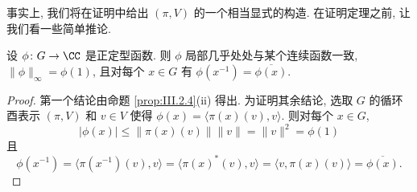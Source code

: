 事实上, 我们将在证明中给出 $(\pi, V)$ 的一个相当显式的构造.
在证明定理之前, 让我们看一些简单推论.

\begin{corollary}[正定型函数的性质]
\label{cor:III.2.6}
设 $\phi \colon G \to \CC$ 是正定型函数. 则 $\phi$ 局部几乎处处与某个连续函数一致, $\|\phi\|_{\infty} = \phi(1)$, 且对每个 $x \in G$ 有 $\phi(x^{-1}) = \overline{\phi(x)}$.
\end{corollary}

\begin{proof}
第一个结论由命题 \ref{prop:III.2.4}(ii) 得出. 为证明其余结论, 选取 $G$ 的循环酉表示 $(\pi, V)$ 和 $v \in V$ 使得 $\phi(x) = \langle \pi(x)(v), v \rangle$. 则对每个 $x \in G$,
\[
|\phi(x)| \leq \|\pi(x)(v)\|\|v\| = \|v\|^2 = \phi(1)
\]
且
\[
\phi(x^{-1}) = \langle \pi(x^{-1})(v), v \rangle = \langle \pi(x)^*(v), v \rangle = \langle v, \pi(x)(v) \rangle = \overline{\phi(x)}.
\]
\end{proof}

